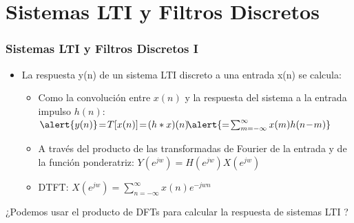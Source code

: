   



\section{Sistemas LTI y Filtros Discretos}



\begin{frame}
\frametitle{Sistemas LTI y Filtros Discretos I}

\footnotesize

\begin{itemize}
\item La respuesta y(n) de un sistema LTI discreto a una entrada  x(n) se calcula:
\begin{itemize}
\footnotesize
\item Como la convolución entre  $x(n)$ y la respuesta del sistema a la entrada impulso $h(n)$:
	$\alert{y(n)}\!=\!T[x(n)]\!=\!(h*x)(n)\!\alert{=\!\sum_{m=-\infty}^\infty x(m)h(n\!-\!m)}$
\vspace{0.1cm}
\item A través del producto de las transformadas de Fourier de la entrada y de la función ponderatriz: $Y(e^{jw})=H(e^{jw})X(e^{jw})$

\vspace{0.1cm}
\item DTFT: $X(e^{jw})=\sum_{n=-\infty}^{\infty} x(n) e^{-jwn}$
\end{itemize}


\end{itemize}

\alert{¿Podemos usar el producto de DFTs para calcular la respuesta de sistemas LTI ?}


\begin{itemize}

\end{itemize}
\end{frame}

